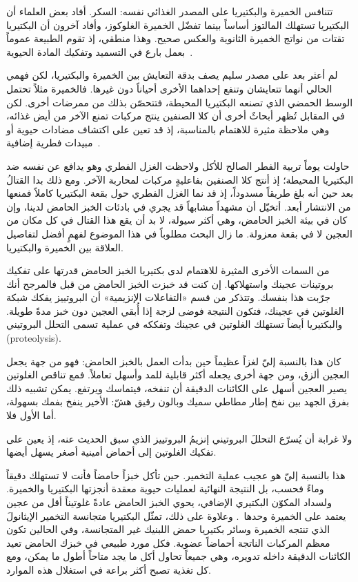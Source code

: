تتنافس الخميرة والبكتيريا على المصدر الغذائي نفسه: السكر. أفاد بعض العلماء أن البكتيريا تستهلك المالتوز أساساً بينما تفضّل الخميرة الغلوكوز، وأفاد آخرون أن البكتيريا تقتات من نواتج الخميرة الثانوية والعكس صحيح. وهذا منطقي، إذ تقوم الطبيعة عموماً بعمل بارع في التسميد وتفكيك المادة الحيوية~\cite{lactobacillus+sanfrancisco}.

لم أعثر بعد على مصدر سليم يصف بدقة التعايش بين الخميرة والبكتيريا، لكن فهمي الحالي أنهما تتعايشان وتنفع إحداهما الأخرى أحياناً دون غيرها. فالخميرة مثلاً تحتمل الوسط الحمضي الذي تصنعه البكتيريا المحيطة، فتتحصّن بذلك من ممرضات أخرى. لكن في المقابل تُظهر أبحاثٌ أخرى أن كلا الصنفين ينتج مركبات تمنع الآخر من أيض غذائه، وهي ملاحظة مثيرة للاهتمام بالمناسبة، إذ قد تعين على اكتشاف مضادات حيوية أو مبيدات فطرية إضافية~\cite{mold+lactic+acid+bacteria}.

حاولت يوماً تربية الفطر الصالح للأكل ولاحظت الغزل الفطري وهو يدافع عن نفسه ضد البكتيريا المحيطة؛ إذ أنتج كلا الصنفين بفاعليةٍ مركبات لمحاربة الآخر. ومع ذلك بدا القتالُ بعد حين أنه بلغ طريقاً مسدوداً، إذ قد نما الغزل الفطري حول بقعة البكتيريا كاملاً فمنعها من الانتشار أبعد. أتخيّل أن مشهداً مشابهاً قد يجري في بادئات الخبز الحامض لدينا، وإن كان في بيئة الخبز الحامض، وهي أكثر سيولة، لا بد أن يقع هذا القتال في كل مكان من العجين لا في بقعة معزولة. ما زال البحث مطلوباً في هذا الموضوع لفهمٍ أفضل لتفاصيل العلاقة بين الخميرة والبكتيريا.

من السمات الأخرى المثيرة للاهتمام لدى بكتيريا الخبز الحامض قدرتها على تفكيك بروتينات عجينك واستهلاكها. إن كنت قد خبزت الخبز الحامض من قبل فالمرجح أنك جرّبت هذا بنفسك. وتتذكر من قسم «التفاعلات الإنزيمية» أن البروتييز يفكك شبكة الغلوتين في عجينك، فتكون النتيجة فوضى لزجة إذا أُبقي العجين دون خبز مدةً طويلة. والبكتيريا أيضاً تستهلك الغلوتين في عجينك وتفككه في عملية تسمى التحلل البروتيني \textenglish{(proteolysis)}.

كان هذا بالنسبة إليّ لغزاً عظيماً حين بدأت العمل بالخبز الحامض: فهو من جهة يجعل العجين ألزق، ومن جهة أخرى يجعله أكثر قابلية للمد وأسهل تعاملاً. فمع تناقص الغلوتين يصير العجين أسهل على الكائنات الدقيقة أن تنفخه، فيتماسك ويرتفع. يمكن تشبيه ذلك بفرق الجهد بين نفخ إطار مطاطي سميك وبالون رقيق هشّ: الأخير ينفخ بفمك بسهولة، أما الأول فلا.

ولا غرابة أن يُسرّع التحللَ البروتيني إنزيمُ البروتييز الذي سبق الحديث عنه، إذ يعين على تفكيك الغلوتين إلى أحماض أمينية أصغر يسهل أيضها.

هذا بالنسبة إليّ هو عجيب عملية التخمير. حين تأكل خبزاً حامضاً فأنت لا تستهلك دقيقاً وماءً فحسب، بل النتيجة النهائية لعمليات حيوية معقدة أنجزتها البكتيريا والخميرة. ولسداد المكوّن البكتيري الإضافي، يحوي الخبز الحامض عادةً غلوتيناً أقل من عجين يعتمد على الخميرة وحدها~\cite{proteolysis+sourdough+bacteria}. وعلاوة على ذلك، تمثّل البكتيريا متجانسة التخمير الإيثانولَ الذي تنتجه الخميرة وسائر بكتيريا حمض اللبنيك غير المتجانسة، وفي الحالين تكون معظم المركبات الناتجة أحماضاً عضوية. فكل مورد طبيعي في خبزك الحامض تعيد الكائنات الدقيقة داخله تدويره، وهي جميعاً تحاول أكل ما يجد متاحاً أطول ما يمكن، ومع كل تغذية تصبح أكثر براعة في استغلال هذه الموارد.

